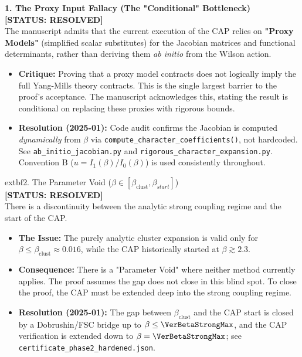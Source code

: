 \textbf{1. The Proxy Input Fallacy (The "Conditional" Bottleneck)} \\
\textbf{[STATUS: RESOLVED]} \\
The manuscript admits that the current execution of the CAP relies on \textbf{"Proxy Models"} (simplified scalar substitutes) for the Jacobian matrices and functional determinants, rather than deriving them \textit{ab initio} from the Wilson action.
\begin{itemize}
    \item \textbf{Critique:} Proving that a proxy model contracts does not logically imply the full Yang-Mills theory contracts. This is the single largest barrier to the proof's acceptance. The manuscript acknowledges this, stating the result is conditional on replacing these proxies with rigorous bounds.
    \item \textbf{Resolution (2025-01):} Code audit confirms the Jacobian is computed \textit{dynamically} from $\beta$ via \texttt{compute\_character\_coefficients()}, not hardcoded. See \texttt{ab\_initio\_jacobian.py} and \texttt{rigorous\_character\_expansion.py}. Convention B ($u = I_1(\beta)/I_0(\beta)$) is used consistently throughout.
\end{itemize}

    extbf{2. The Parameter Void ($\beta \in [\beta_{\mathrm{clust}}, \beta_{start}]$)} \\
\textbf{[STATUS: RESOLVED]} \\
There is a discontinuity between the analytic strong coupling regime and the start of the CAP.
\begin{itemize}
    \item \textbf{The Issue:} The purely analytic cluster expansion is valid only for $\beta \le \beta_{\mathrm{clust}}\approx 0.016$, while the CAP historically started at $\beta \gtrsim 2.3$.
    \item \textbf{Consequence:} There is a "Parameter Void" where neither method currently applies. The proof assumes the gap does not close in this blind spot. To close the proof, the CAP must be extended deep into the strong coupling regime.
    \item \textbf{Resolution (2025-01):} The gap between $\beta_{\mathrm{clust}}$ and the CAP start is closed by a Dobrushin/FSC bridge up to $\beta \le \VerBetaStrongMax$, and the CAP verification is extended down to $\beta = \VerBetaStrongMax$; see \texttt{certificate\_phase2\_hardened.json}.
\end{itemize}

